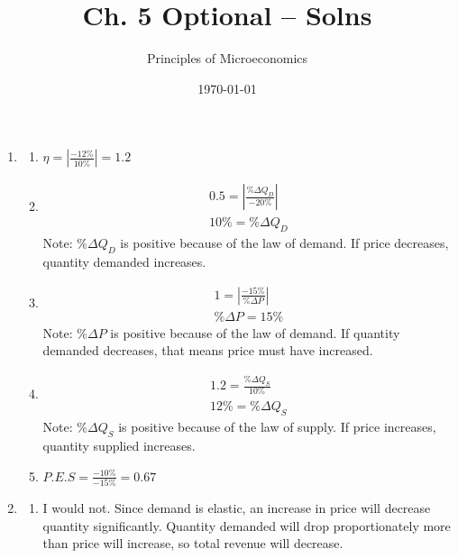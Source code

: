 \documentclass{article}
\title{Ch. 5 Optional -- Solns}
\author{Principles of Microeconomics}
\date{\today}
\begin{document}
\maketitle

\begin{enumerate}

\item

	\begin{enumerate}
	
	\item $\eta = \left| \frac{-12\%}{10\%} \right| = 1.2$
	
	\item 
		\begin{gather*}
		0.5 = \left| \frac{\% \Delta Q_D}{-20\%} \right| \\
		10\% = \% \Delta Q_D
		\end{gather*}
		Note: $\% \Delta Q_D$ is positive because of the law of demand. If price decreases, quantity demanded increases.
		
	\item 
		\begin{gather*}
		1 = \left| \frac{-15\%}{\% \Delta P} \right| \\
		\% \Delta P = 15\%
		\end{gather*}
		Note: $\% \Delta P$ is positive because of the law of demand. If quantity demanded decreases, that means price must have increased.
		
	\item
		\begin{gather*}
		1.2 = \frac{\% \Delta Q_S}{10\%} \\
		12\% = \% \Delta Q_S
		\end{gather*}
		Note: $\% \Delta Q_S$ is positive because of the law of supply. If price increases, quantity supplied increases.
		
	\item $P.E.S = \frac{-10\%}{-15\%} = 0.67$
	
	\end{enumerate}
	
\newpage
	
\item

	\begin{enumerate}
	
	\item I would not. Since demand is elastic, an increase in price will decrease quantity significantly. Quantity demanded will drop proportionately more than price will increase, so total revenue will decrease.
	

\end{enumerate}
\end{enumerate}
\end{document}
